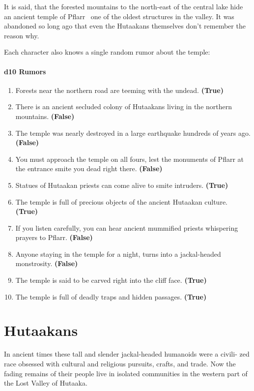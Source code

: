 \documentclass[english,11pt,openany,letterpaper,twocolumn]{book}
\begin{document}
It is said, that the forested mountains to the north-east of the central lake hide an ancient temple of Pflarr \dash\ one of the oldest structures in the valley. It was abandoned so long ago that even the Hutaakans themselves don't remember the reason why.

\tab Each character also knows a single random rumor about the temple:

\paragraph{d10 Rumors}
\begin{enumerate}
	\item Forests near the northern road are teeming with the undead. \textbf{(True)}
	\item There is an ancient secluded colony of Hutaakans living in the northern mountains. \textbf{(False)}
	\item The temple was nearly destroyed in a large earthquake hundreds of years ago. \textbf{(False)}
	\item You must approach the temple on all fours, lest the monuments of Pflarr at the entrance smite you dead right there. \textbf{(False)}
	\item Statues of Hutaakan priests can come alive to smite intruders. \textbf{(True)}
	\item The temple is full of precious objects of the ancient Hutaakan culture. \textbf{(True)}
	\item If you listen carefully, you can hear ancient mummified priests whispering prayers to Pflarr. \textbf{(False)}
	\item Anyone staying in the temple for a night, turns into a jackal-headed monstrosity. \textbf{(False)}
	\item The temple is said to be carved right into the cliff face. \textbf{(True)}
	\item The temple is full of deadly traps and hidden passages. \textbf{(True)}
\end{enumerate}

\break

\section{Hutaakans}

In ancient times these tall and slender jackal-headed humanoids were a civili- zed race obsessed with cultural and religious pursuits, crafts, and trade. Now the fading remains of their people live in isolated communities in the western part of the Lost Valley of Hutaaka.
\end{document}
